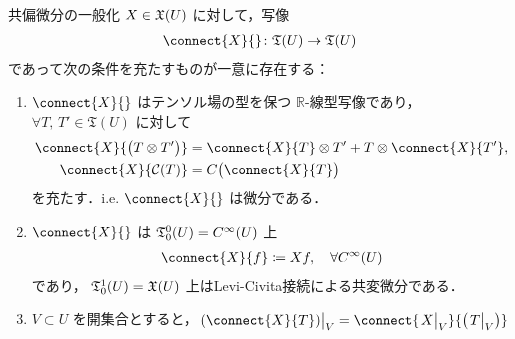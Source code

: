 \documentclass[geometry_main]{subfiles}
\begin{document}
\begin{myprop}[label=covdv_tensor]{共偏微分の一般化}
	$X \in \mathfrak{X}(U)$ に対して，写像
	\begin{align} 
		\connect{X}{} \colon \mathfrak{T}(U) \to \mathfrak{T}(U)
	\end{align}
	であって次の条件を充たすものが一意に存在する：
	\begin{enumerate} 
		\item $\connect{X}{}$ はテンソル場の型を保つ $\mathbb{R}$-線型写像であり，$\forall T,\, T' \in \mathfrak{T}(U)$ に対して
		\begin{align} 
			\connect{X}{\bigl( T \otimes T' \bigr) } &= \connect{X}{T} \otimes T' + T \otimes \connect{X}{T'},\\
			\connect{X}{\mathcal{C}(T)} &= C \bigl( \connect{X}{T} \bigr) 
		\end{align}
		を充たす．i.e. $\connect{X}{}$ は微分である．
		\item $\connect{X}{}$ は $\mathfrak{T}^0_0(U) = C^\infty(U)$ 上
		\begin{align} 
			\connect{X}{f} \coloneqq Xf,\quad \forall \cinftyf{U}
		\end{align}
		であり，
		$\mathfrak{T}^1_0(U) = \mathfrak{X}(U)$ 上はLevi-Civita接続による共変微分である．
		\item $V \subset U$ を開集合とすると，$\eval{(\connect{X}{T})}_V = \connect{\eval{X}_V}{ \bigl( \eval{T}_V \bigr) } $
	\end{enumerate}
\end{myprop}
\end{document}
